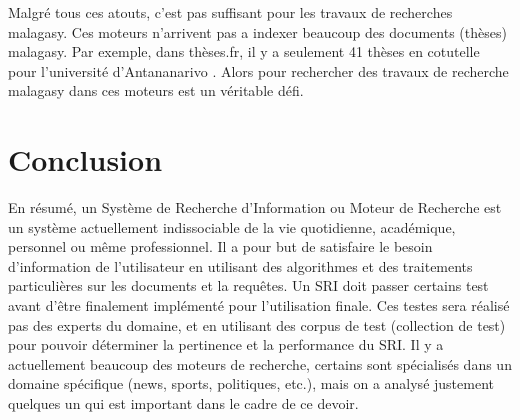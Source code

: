 Malgré tous ces atouts, c'est pas suffisant pour les travaux de recherches malagasy. Ces moteurs n'arrivent pas a indexer beaucoup des documents (thèses) malagasy. Par exemple, dans thèses.fr, il y a seulement 41 thèses en cotutelle pour l'université d'Antananarivo \citep{these-fr}. Alors pour rechercher des travaux de recherche malagasy dans ces moteurs est un véritable défi.

\section{Conclusion}
En résumé, un Système de Recherche d'Information ou Moteur de Recherche est un système actuellement indissociable de la vie quotidienne, académique, personnel ou même professionnel. Il a pour but de satisfaire le besoin d'information de l'utilisateur en utilisant des algorithmes et des traitements particulières sur les documents et la requêtes. Un SRI doit passer certains test avant d'être finalement implémenté pour l'utilisation finale. Ces testes sera réalisé pas des experts du domaine, et en utilisant des corpus de test (collection de test) pour pouvoir déterminer la pertinence et la performance du SRI\@. Il y a actuellement beaucoup des moteurs de recherche, certains sont spécialisés dans un domaine spécifique (news, sports, politiques, etc.), mais on a analysé justement quelques un qui est important dans le cadre de ce devoir.
